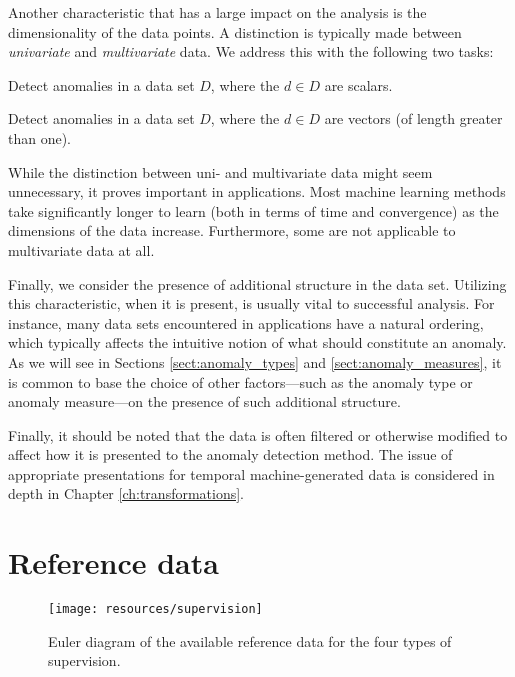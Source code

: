 Another characteristic that has a large impact on the analysis is the dimensionality of the data points. A distinction is typically made between \emph{univariate} and \emph{multivariate} data. We address this with the following two tasks:
\begin{task}
  Detect anomalies in a data set $D$, where the $d \in D$ are scalars.
\end{task}
\begin{task}
  Detect anomalies in a data set $D$, where the $d \in D$ are vectors (of length greater than one).
\end{task}
While the distinction between uni- and multivariate data might seem unnecessary, it proves important in applications. Most machine learning methods take significantly longer to learn (both in terms of time and convergence) as the dimensions of the data increase. Furthermore, some are not applicable to multivariate data at all.

Finally, we consider the presence of additional structure in the data set. Utilizing this characteristic, when it is present, is usually vital to successful analysis. For instance, many data sets encountered in applications have a natural ordering, which typically affects the intuitive notion of what should constitute an anomaly. As we will see in Sections \ref{sect:anomaly_types} and \ref{sect:anomaly_measures}, it is common to base the choice of other factors---such as the anomaly type or anomaly measure---on the presence of such additional structure. 

Finally, it should be noted that the data is often filtered or otherwise modified to affect how it is presented to the anomaly detection method. The issue of appropriate presentations for temporal machine-generated data is considered in depth in Chapter \ref{ch:transformations}.

\clearpage
 
\section{Reference data}
\label{sect:reference_data}

\begin{wrapfigure}{r}{0.5\textwidth}
    \vspace{-25pt}
    \begin{center}
        \leavevmode
        \texttt{[image: resources/supervision]}
    \end{center}
    \caption{{\small Euler diagram of the available reference data for the four types of supervision.}}
    \label{fig:supervision}
    \vspace{-40pt}
\end{wrapfigure}


